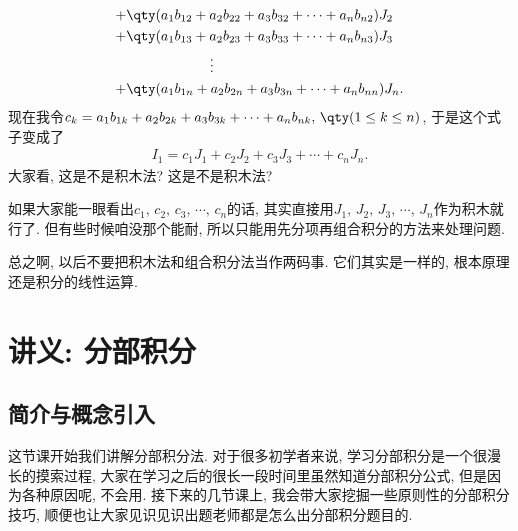 \documentclass{ctexbook}
\begin{document}
{\begin{align*}
+{}&\qty(a_{1}b_{12}+a_{2}b_{22}+a_{3}b_{32}+\cdots+a_{n}b_{n2})J_{2}\\
+{}&\qty(a_{1}b_{13}+a_{2}b_{23}+a_{3}b_{33}+\cdots+a_{n}b_{n3})J_{3}\\
{}&\qquad\qquad\qquad\vdots\\
+{}&\qty(a_{1}b_{1n}+a_{2}b_{2n}+a_{3}b_{3n}+\cdots+a_{n}b_{nn})J_{n}
.\end{align*}
现在我令$c_{k}=a_{1}b_{1k}+a_{2}b_{2k}+a_{3}b_{3k}+\cdots+a_{n}b_{nk},\,\qty(1\le k\le n)$, 于是这个式子变成了
\begin{align*}
I_{1}=c_{1}J_{1}+c_{2}J_{2}+c_{3}J_{3}+\cdots+c_{n}J_{n}
.\end{align*}
大家看, 这是不是积木法? 这是不是积木法? \par
如果大家能一眼看出$c_{1},\,c_{2},\,c_{3},\,\cdots,\,c_{n}$的话, 其实直接用$J_{1},\,J_{2},\,J_{3},\,\cdots,\,J_{n}$作为积木就行了. 但有些时候咱没那个能耐, 所以只能用先分项再组合积分的方法来处理问题. \par
总之啊, 以后不要把积木法和组合积分法当作两码事. 它们其实是一样的, 根本原理还是积分的线性运算. \par
\chapter{讲义: 分部积分}
\section{简介与概念引入}
这节课开始我们讲解分部积分法. 对于很多初学者来说, 学习分部积分是一个很漫长的摸索过程, 大家在学习之后的很长一段时间里虽然知道分部积分公式, 但是因为各种原因呢, 不会用. 接下来的几节课上, 我会带大家挖掘一些原则性的分部积分技巧, 顺便也让大家见识见识出题老师都是怎么出分部积分题目的. \par
}
\end{document}
